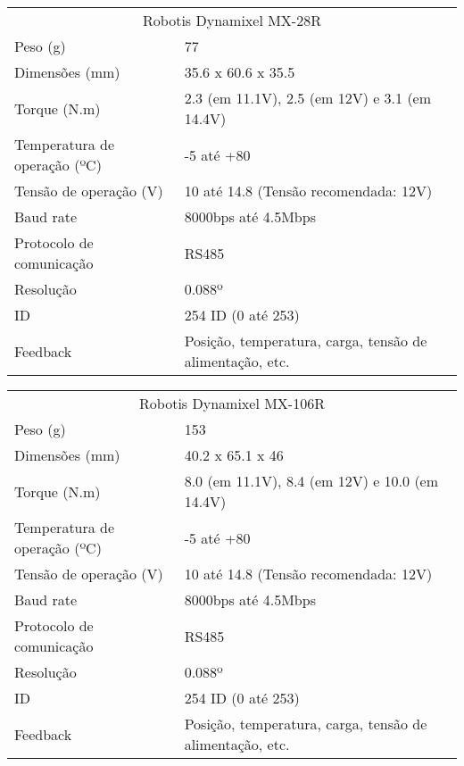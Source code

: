 \begin{table}[]
	\begin{tabular}{ll}
		\multicolumn{2}{c}{Robotis Dynamixel MX-28R}                                            \\
		Peso (g)                     & 77                                                       \\
		Dimensões (mm)               & 35.6 x 60.6 x 35.5                                       \\
		Torque (N.m)                 & 2.3 (em 11.1V), 2.5 (em 12V) e 3.1 (em 14.4V)            \\
		Temperatura de operação (ºC) & -5 até +80                                               \\
		Tensão de operação (V)       & 10 até 14.8 (Tensão recomendada: 12V)                    \\
		Baud rate                    & 8000bps até 4.5Mbps                                      \\
		Protocolo de comunicação     & RS485                                                    \\
		Resolução                    & 0.088º                                                   \\
		ID                           & 254 ID (0 até 253)                                       \\
		Feedback                     & Posição, temperatura, carga, tensão de alimentação, etc.
	\end{tabular}
\end{table}


\begin{table}[]
	\begin{tabular}{ll}
		\multicolumn{2}{c}{Robotis Dynamixel MX-106R}                                           \\
		Peso (g)                     & 153                                                      \\
		Dimensões (mm)               & 40.2 x 65.1 x 46                                         \\
		Torque (N.m)                 & 8.0 (em 11.1V), 8.4 (em 12V) e 10.0 (em 14.4V)           \\
		Temperatura de operação (ºC) & -5 até +80                                               \\
		Tensão de operação (V)       & 10 até 14.8 (Tensão recomendada: 12V)                    \\
		Baud rate                    & 8000bps até 4.5Mbps                                      \\
		Protocolo de comunicação     & RS485                                                    \\
		Resolução                    & 0.088º                                                   \\
		ID                           & 254 ID (0 até 253)                                       \\
		Feedback                     & Posição, temperatura, carga, tensão de alimentação, etc.
	\end{tabular}
\end{table}


